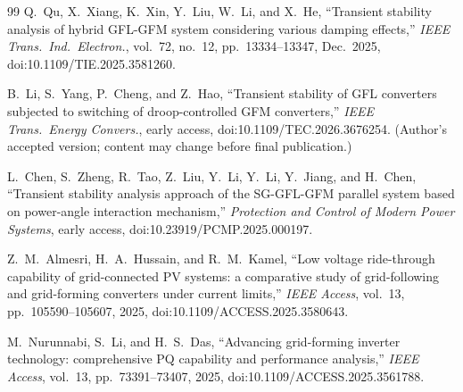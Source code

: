\documentclass[12pt,a4paper]{article}
\theoremstyle{remark}
\begin{document}
\begin{thebibliography}{99}
 Q.~Qu, X.~Xiang, K.~Xin, Y.~Liu, W.~Li, and X.~He, ``Transient
stability analysis of hybrid GFL-GFM system considering various damping effects,''
\emph{IEEE Trans.\ Ind.\ Electron.}, vol.~72, no.~12, pp.~13334--13347,
Dec.\ 2025, doi:10.1109/TIE.2025.3581260.

 B.~Li, S.~Yang, P.~Cheng, and Z.~Hao, ``Transient stability of
GFL converters subjected to switching of droop-controlled GFM converters,''
\emph{IEEE Trans.\ Energy Convers.}, early access,
doi:10.1109/TEC.2026.3676254. (Author's accepted version; content may change
before final publication.)

 L.~Chen, S.~Zheng, R.~Tao, Z.~Liu, Y.~Li, Y.~Li, Y.~Jiang, and
H.~Chen, ``Transient stability analysis approach of the SG-GFL-GFM parallel system
based on power-angle interaction mechanism,'' \emph{Protection and Control of
Modern Power Systems}, early access, doi:10.23919/PCMP.2025.000197.

 Z.~M.~Almesri, H.~A.~Hussain, and R.~M.~Kamel, ``Low voltage
ride-through capability of grid-connected PV systems: a comparative study of
grid-following and grid-forming converters under current limits,'' \emph{IEEE
Access}, vol.~13, pp.~105590--105607, 2025, doi:10.1109/ACCESS.2025.3580643.

 M.~Nurunnabi, S.~Li, and H.~S.~Das, ``Advancing
grid-forming inverter technology: comprehensive PQ capability and performance
analysis,'' \emph{IEEE Access}, vol.~13, pp.~73391--73407, 2025,
doi:10.1109/ACCESS.2025.3561788.
\end{thebibliography}
\end{document}
